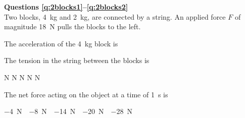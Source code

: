 \documentclass{../../../oss-apphys-exam}
\begin{document}
\genheader


\genmultidirections

\gengravity

\raggedcolumns
\begin{multicols*}{2}
  \textbf{Questions \ref{q:2blocks1}--\ref{q:2blocks2}}\\
  Two blocks, \SI{4}{\kilo\gram} and \SI{2}{\kilo\gram}, are connected by a
  string. An applied force $F$ of magnitude \SI{18}{\newton} pulls the blocks
  to the left.
  \begin{center}
  \end{center}

  \begin{questions}
    \question The acceleration of the \SI{4}{\kilo\gram} block is
    \label{q:2blocks1}
    
    \question The tension in the string between the blocks is
    \begin{choices}
       N
       N
       N
       N
       N
    \end{choices}
    \label{q:2blocks2}


    \question The net force acting on the object at a time of \SI{1}{\second} is
    \begin{choices}
      \choice\SI{-4}\newton
      \choice\SI{-8}\newton
      \choice\SI{-14}\newton
      \choice\SI{-20}\newton
      \choice\SI{-28}\newton
    \end{choices}
    \label{pos1}
    

\end{questions}
\end{multicols*}
\end{document}
